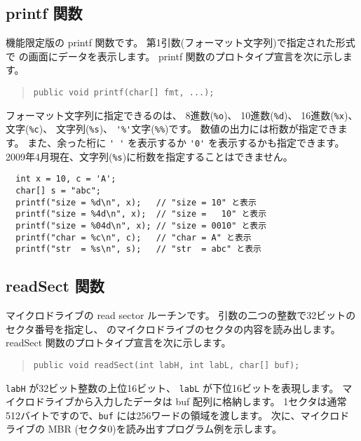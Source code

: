 \subsection{printf 関数}
機能限定版の printf 関数です。
第1引数(フォーマット文字列)で指定された形式で
\tac の画面にデータを表示します。
printf 関数のプロトタイプ宣言を次に示します。

\begin{quote}
\begin{verbatim}
public void printf(char[] fmt, ...);
\end{verbatim}
\end{quote}

フォーマット文字列に指定できるのは、
8進数(\verb/%o/)、
10進数(\verb/%d/)、
16進数(\verb/%x/)、
文字(\verb/%c/)、
文字列(\verb/%s/)、
\verb/'%'/文字(\verb/%%/)です。
数値の出力には桁数が指定できます。
また、余った桁に \verb/' '/ を表示するか
\verb/'0'/ を表示するかも指定できます。
2009年4月現在、文字列(\verb/%s/)に桁数を指定することはできません。

\begin{mylist}
\begin{verbatim}
  int x = 10, c = 'A';
  char[] s = "abc";
  printf("size = %d\n", x);   // "size = 10" と表示
  printf("size = %4d\n", x);  // "size =   10" と表示
  printf("size = %04d\n", x); // "size = 0010" と表示
  printf("char = %c\n", c);   // "char = A" と表示
  printf("str  = %s\n", s);   // "str  = abc" と表示
\end{verbatim}
\end{mylist}

\subsection{readSect 関数}

マイクロドライブの read sector ルーチンです。
引数の二つの整数で32ビットのセクタ番号を指定し、
\tac のマイクロドライブのセクタの内容を読み出します。
readSect 関数のプロトタイプ宣言を次に示します。

\begin{quote}
\begin{verbatim}
public void readSect(int labH, int labL, char[] buf);
\end{verbatim}
\end{quote}

\verb/labH/ が32ビット整数の上位16ビット、
\verb/labL/ が下位16ビットを表現します。
マイクロドライブから入力したデータは buf 配列に格納します。
1セクタは通常512バイトですので、\verb/buf/ には256ワードの領域を渡します。
次に、マイクロドライブの MBR (セクタ0)を読み出すプログラム例を示します。

